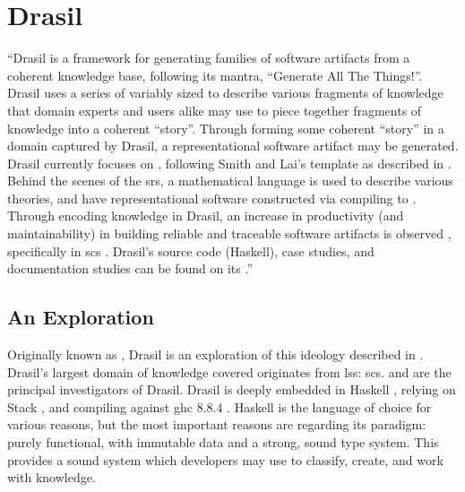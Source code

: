 \chapter{Drasil}
\label{chap:drasil}


\begin{mdleftbar}
      ``Drasil is a framework for generating families of software artifacts from
      a coherent knowledge base, following its mantra, ``Generate All The
      Things!''. Drasil uses a series of variably sized  to describe
      various fragments of knowledge that domain experts and users alike may use
      to piece together fragments of knowledge into a coherent ``story''.
      Through forming some coherent ``story'' in a domain captured by Drasil, a
      representational software artifact may be generated. Drasil currently
      focuses on , following Smith and Lai's  template as
      described in \cite{SmithAndLai2005}. Behind the scenes of the \acs{srs}, a
      mathematical language is used to describe various theories, and have
      representational software constructed via compiling to 
      \cite{Carette2019}. Through encoding knowledge in Drasil, an increase in
      productivity (and maintainability) in building reliable and traceable
      software artifacts is observed \cite{SzymczakEtAl2016}, specifically in
      \acs{scs} \cite{Smith2018}. Drasil's source code (Haskell), case studies,
      and documentation studies can be found on its
      .''
      \cite{Balaci2021Poster}
\end{mdleftbar}

\section{An Exploration}

Originally known as , Drasil is an exploration of this ideology
described in . Drasil's largest domain of knowledge
covered originates from \acs{lss}: \acl{scs}.  and  are the principal
investigators of Drasil. Drasil is deeply embedded in Haskell
\cite{Haskell2010}, relying on Stack \cite{HaskellStack}, and compiling
against \acs{ghc} 8.8.4 \cite{GHC884}. Haskell is the language of choice
for various reasons, but the most important reasons are regarding its
paradigm: purely functional, with immutable data and a strong, sound type
system. This provides a sound system which developers may use to classify,
create, and work with knowledge.

